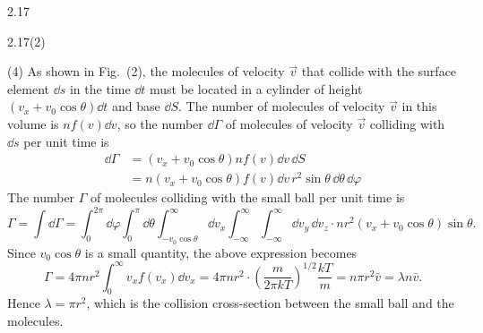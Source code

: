 \begin{solution}{2.17}
\begin{figbox}{2.17(2)}
\end{figbox}

(4) As shown in Fig.~(2), the molecules of velocity $\vec{v}$ that collide with the surface element $\dd s$ in the time $\dd t$ must be located in a cylinder of height $(v_x+v_0\cos\theta)\dd t$ and base $\dd S$. The number of molecules of velocity $\vec{v}$ in this volume is $nf(v)\dd v$, so the number $\dd\Gamma$ of molecules of velocity $\vec{v}$ colliding with $\dd s$ per unit time is
\begin{equation}
\begin{aligned}
\dd\Gamma&=(v_x+v_0\cos\theta)nf(v)\dd v\,\dd S\\
&=n(v_x+v_0\cos\theta)f(v)\dd v\,r^2\sin\theta\,\dd\theta\,\dd\varphi
\end{aligned}\tag{2}
\end{equation}
The number $\Gamma$ of molecules colliding with the small ball per unit time is
\[
\Gamma=\int \dd\Gamma
=\int_0^{2\pi}\dd\varphi\int_0^{\pi}\dd\theta
\int_{-v_0\cos\theta}^{\infty}\dd v_x\int_{-\infty}^{\infty}\int_{-\infty}^{\infty}\dd v_y\,\dd v_z
\cdot nr^2(v_x+v_0\cos\theta)\sin\theta.
\]
Since $v_0\cos\theta$ is a small quantity, the above expression becomes
\[
\Gamma=4\pi nr^2\int_0^{\infty}v_xf(v_x)\dd v_x
=4\pi nr^2\cdot\left(\frac{m}{2\pi kT}\right)^{1/2}\frac{kT}{m}
=n\pi r^2\bar{v}=\lambda n\bar{v}.
\]
Hence $\lambda=\pi r^2$, which is the collision cross-section between the small ball and the molecules.
\end{solution}

